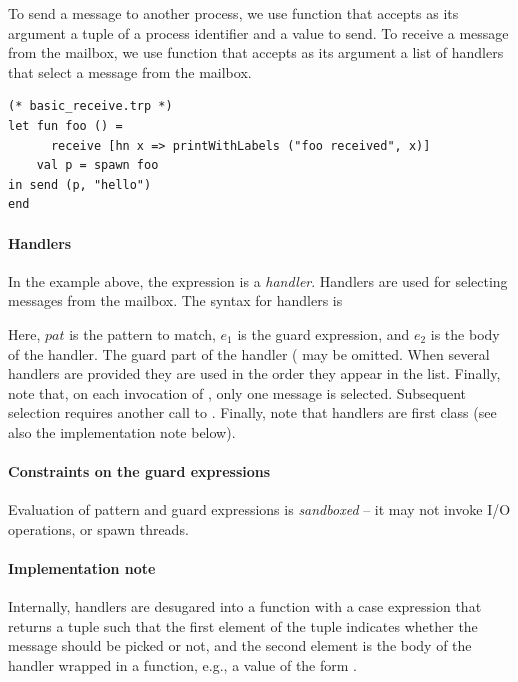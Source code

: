 To send a message to another process, we use function  that accepts as its argument a tuple of
a process identifier and a value to send. To receive a message from the mailbox, we use function 
that accepts as its argument a list of handlers that select a message from the mailbox.

\begin{lstlisting}
(* basic_receive.trp *)
let fun foo () =
      receive [hn x => printWithLabels ("foo received", x)]
    val p = spawn foo
in send (p, "hello")
end
\end{lstlisting}

\paragraph{Handlers}\label{sec:handlers}
In the example above, the expression  is a \emph{handler}.
Handlers are used for selecting messages from the mailbox. The syntax for handlers is
\begin{center}
 \end{center}

 Here, $\mathit{pat}$ is the pattern to match, $\mathit{e_1}$ is the guard expression, and $\mathit{e_2}$ is the body of the handler.
 The guard part of the handler ( may be omitted.
 When several handlers are provided they are used in the order they appear in the list.
Finally, note that, on each invocation of , only one message is selected. Subsequent selection
requires another call to .
Finally, note that handlers are first class (see also the implementation note below).

\paragraph{Constraints on the guard expressions}
Evaluation of pattern and guard expressions is \emph{sandboxed} -- it may not invoke I/O operations, or
spawn threads.

\paragraph{Implementation note}
Internally, handlers are desugared into a function with a case expression that returns a tuple such that the first
element of the tuple indicates whether the message should be picked or not, and the second element is the body
of the handler wrapped in a function, e.g., a value of the form .


